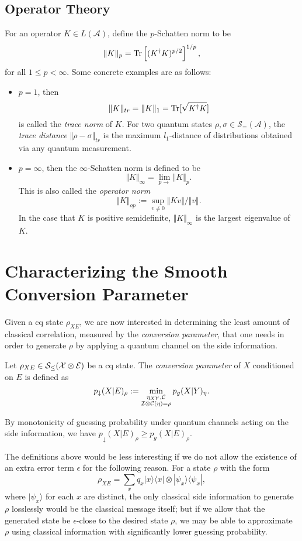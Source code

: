 \subsection{Operator Theory}
For an operator $K\in L(\mathcal{A})$, define the $p$-Schatten norm to be
$$\Vert K\Vert_p = \textnormal{Tr}\left[(K^\dag K)^{p/2}\right]^{1/p},$$
for all $1\leq p<\infty$. Some concrete examples are as follows:
\begin{itemize}
    \item $p=1$, then $$\Vert K\Vert_{tr} = \Vert K\Vert_1=\textnormal{Tr}[\sqrt{K^\dag K}]$$ is called the \emph{trace norm} of $K$. For two quantum states $\rho,\sigma\in \mathcal{S}_{=}(\mathcal{A})$, the \emph{trace distance} $\Vert \rho-\sigma\Vert_{tr}$ is the maximum $l_1$-distance of distributions obtained via any quantum measurement.
    \item $p=\infty$, then the $\infty$-Schatten norm is defined to be
        $$\Vert K\Vert_{\infty} = \lim_{p\rightarrow }\Vert K\Vert_p.$$
        This is also called the \emph{operator norm}
        $$\Vert K\Vert_{op}:=\sup_{v\neq 0}\Vert Kv\Vert/\Vert v\Vert.$$
        In the case that $K$ is positive semidefinite, $\Vert K\Vert_{\infty}$ is the largest eigenvalue of $K$.
    \end{itemize}

\section{Characterizing the Smooth Conversion Parameter}
\label{sec:cgp}
Given a cq state $\rho_{XE}$, we are now interested in determining the least amount of classical correlation,  measured by the \emph{conversion parameter}, that one needs in order to generate $\rho$ by applying a quantum channel on the side information.
\begin{definition}
    \label{defn:cgp}
    Let $\rho_{XE}\in \mathcal{S}_{\leq}(\mathcal{X}\otimes \mathcal{E})$ be a cq state. The \emph{conversion parameter} of $X$ conditioned on $E$ is defined as
    $$p_{\downarrow}(X|E)_{\rho}:=\min_{\substack{\eta_{XY},\mathcal{C}\\ \mathcal{I}\otimes \mathcal{C}(\eta)=\rho}}p_{g}(X|Y)_\eta.$$
\end{definition}

By monotonicity of guessing probability under quantum channels acting on the side information, we have $p_{\downarrow}(X|E)_{\rho}\geq p_{g}(X|E)_{\rho}$. 

The definitions above would be less interesting if we do not allow the existence of an extra error term $\epsilon$ for the following reason. For a state $\rho$ with the form
$$\rho_{XE}=\sum_{x}q_x|x\rangle\langle x|\otimes |\psi_x\rangle\langle \psi_x|,$$
where $|\psi_x\rangle$ for each $x$ are distinct, the only classical side information to generate $\rho$ losslessly would be the classical message itself; but if we allow that the generated state be $\epsilon$-close to the desired state $\rho$, we may be able to approximate $\rho$ using classical information with significantly lower guessing probability. 

